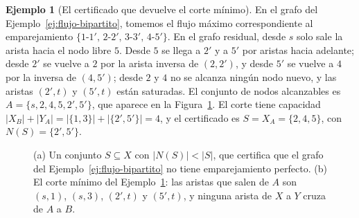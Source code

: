 \documentclass[12pt, spanish, oneside, openany]{book}
\theoremstyle{uprightplain}
\theoremstyle{definition}
\newtheorem{ejemplo}[teorema]{Ejemplo}
\theoremstyle{remark}
\theoremstyle{definition}
\begin{document}
\begin{ejemplo}[El certificado que devuelve el corte mínimo]
\label{ej:flujo-hall}
En el grafo del Ejemplo~\ref{ej:flujo-bipartito}, tomemos el flujo máximo correspondiente al emparejamiento $\{1\text{-}1',\,2\text{-}2',\,3\text{-}3',\,4\text{-}5'\}$. En el grafo residual, desde $s$ solo sale la arista hacia el nodo libre $5$. Desde $5$ se llega a $2'$ y a $5'$ por aristas hacia adelante; desde $2'$ se vuelve a $2$ por la arista inversa de $(2,2')$, y desde $5'$ se vuelve a $4$ por la inversa de $(4,5')$; desde $2$ y $4$ no se alcanza ningún nodo nuevo, y las aristas $(2',t)$ y $(5',t)$ están saturadas. El conjunto de nodos alcanzables es $A=\{s,2,4,5,2',5'\}$, que aparece en la Figura~\ref{fig:flujo-hall}. El corte tiene capacidad $|X_B|+|Y_A|=|\{1,3\}|+|\{2',5'\}|=4$, y el certificado es $S=X_A=\{2,4,5\}$, con $N(S)=\{2',5'\}$.
\end{ejemplo}

\begin{figure}[H]
\centering
{}
\caption{(a) Un conjunto $S\subseteq X$ con $|N(S)|<|S|$, que certifica que el
grafo del Ejemplo~\ref{ej:flujo-bipartito} no tiene emparejamiento perfecto.
(b) El corte mínimo del Ejemplo~\ref{ej:flujo-hall}: las aristas que salen de
$A$ son $(s,1)$, $(s,3)$, $(2',t)$ y $(5',t)$, y ninguna arista de $X$ a $Y$
cruza de $A$ a $B$.}
\label{fig:flujo-hall}
\end{figure}
\end{document}
